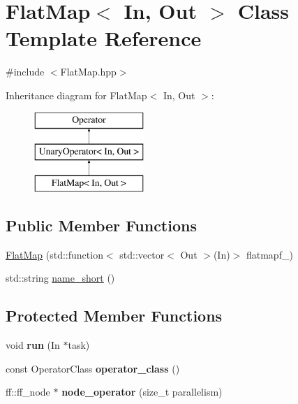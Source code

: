 \hypertarget{class_flat_map}{\section{\-Flat\-Map$<$ \-In, \-Out $>$ \-Class \-Template \-Reference}
\label{class_flat_map}
}


{\ttfamily \#include $<$\-Flat\-Map.\-hpp$>$}

\-Inheritance diagram for \-Flat\-Map$<$ \-In, \-Out $>$\-:\begin{figure}[H]
\begin{center}
\leavevmode
\includegraphics[height=3.000000cm]{class_flat_map}
\end{center}
\end{figure}
\subsection*{\-Public \-Member \-Functions}
\begin{DoxyCompactItemize}
\item 
\hyperlink{class_flat_map_a8ec8c425acf80cf2577b434b195904bd}{\-Flat\-Map} (std\-::function$<$ std\-::vector$<$ \-Out $>$(\-In)$>$ flatmapf\-\_\-)
\item 
std\-::string \hyperlink{class_flat_map_ae5ead8986dd0847b81a65c4857e856c7}{name\-\_\-short} ()
\end{DoxyCompactItemize}
\subsection*{\-Protected \-Member \-Functions}
\begin{DoxyCompactItemize}
\item 
\hypertarget{class_flat_map_ac02777613b25e9fcf563d3060a9fde26}{void {\bfseries run} (\-In $\ast$task)}\label{class_flat_map_ac02777613b25e9fcf563d3060a9fde26}

\item 
\hypertarget{class_flat_map_a448c6f98264a251bb8fb691c94bf2556}{const \-Operator\-Class {\bfseries operator\-\_\-class} ()}\label{class_flat_map_a448c6f98264a251bb8fb691c94bf2556}

\item 
\hypertarget{class_flat_map_aa952263069c0027952f4aa38e5009ce8}{ff\-::ff\-\_\-node $\ast$ {\bfseries node\-\_\-operator} (size\-\_\-t parallelism)}\label{class_flat_map_aa952263069c0027952f4aa38e5009ce8}

\end{DoxyCompactItemize}
